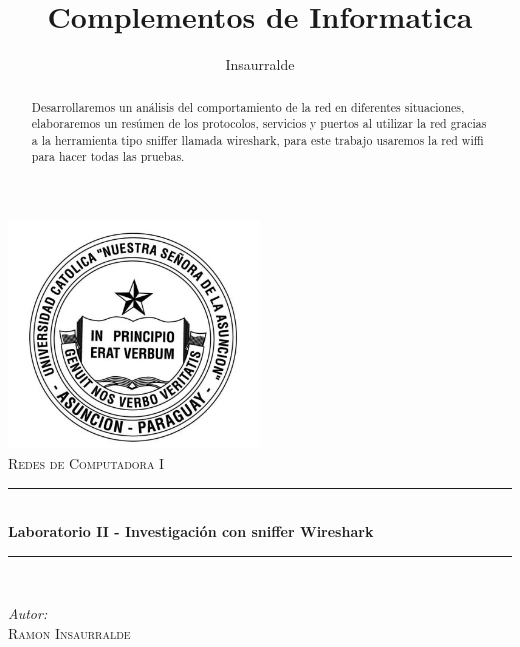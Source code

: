 \documentclass[letterpaper]{article}
\title{Complementos de Informatica}
\author{Insaurralde}
\newcommand{\HRule}{\rule{\linewidth}{0.5mm}}
\begin{document}
	\begin{titlepage}
		\begin{center}
			\includegraphics[width=0.5\textwidth]{img/logo_uca.jpg}\\[1cm]    
			\textsc{\LARGE Redes de Computadora I}\\[1.5cm]


			\HRule \\[0.4cm]
			{ \huge \bfseries 
Laboratorio II - Investigación con sniffer Wireshark }\\[0.4cm]
			\HRule \\[0.4cm]

			\begin{minipage}{0.4\textwidth}
				\begin{flushleft} \large
					\emph{Autor:} \\ \textsc{Ramon Insaurralde}
				\end{flushleft}
			\end{minipage}
		
			\vfill
		\begin{abstract}
				
Desarrollaremos un análisis del comportamiento de la red en diferentes situaciones, elaboraremos un resúmen de los protocolos, servicios y puertos al utilizar la red gracias a la herramienta tipo sniffer llamada wireshark, para este trabajo usaremos la red wiffi para hacer todas las pruebas. 		
			\end{abstract}

		\end{center}
	\end{titlepage}

	\tableofcontents
	\newpage
\end{document}
